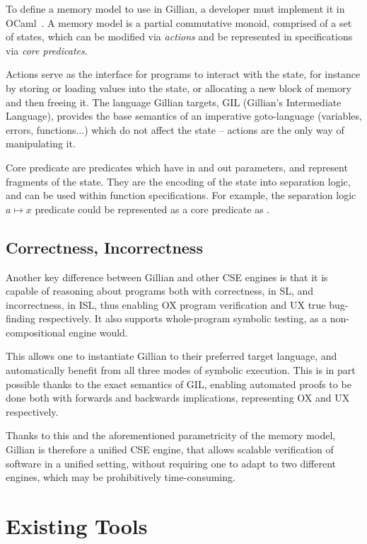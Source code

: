 To define a memory model to use in Gillian, a developer must implement it in OCaml~\cite{ocaml}. A memory model is a partial commutative monoid, comprised of a set of states, which can be modified via \emph{actions} and be represented in specifications via \emph{core predicates}.

Actions serve as the interface for programs to interact with the state, for instance by storing or loading values into the state, or allocating a new block of memory and then freeing it. The language Gillian targets, GIL (Gillian's Intermediate Language), provides the base semantics of an imperative goto-language (variables, errors, functions...) which do not affect the state -- actions are the only way of manipulating it.

Core predicate are predicates which have in and out parameters, and represent fragments of the state. They are the encoding of the state into separation logic, and can be used within function specifications. For example, the separation logic $a \mapsto x$ predicate could be represented as a core predicate as .

\subsection{Correctness, Incorrectness}

Another key difference between Gillian and other CSE engines is that it is capable of reasoning about programs both with correctness, in SL, and incorrectness, in ISL, thus enabling OX program verification and UX true bug-finding respectively. It also supports whole-program symbolic testing, as a non-compositional engine would.

This allows one to instantiate Gillian to their preferred target language, and automatically benefit from all three modes of symbolic execution. This is in part possible thanks to the exact \cite{exactsl} semantics of GIL, enabling automated proofs to be done both with forwards and backwards implications, representing OX and UX respectively.

Thanks to this and the aforementioned parametricity of the memory model, Gillian is therefore a unified CSE engine, that allows scalable verification of software in a unified setting, without requiring one to adapt to two different engines, which may be prohibitively time-consuming.

\section{Existing Tools} \label{sec:existing-tools}

